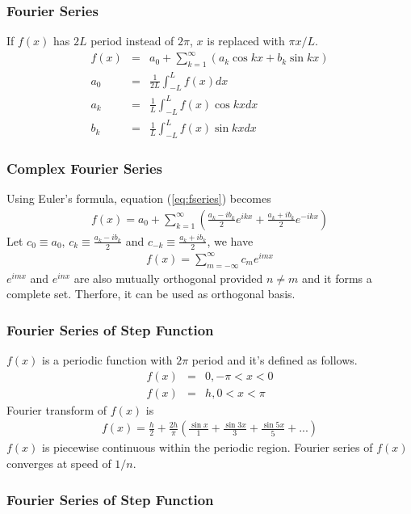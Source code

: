 \documentclass{beamer}
\begin{document}
\begin{frame}
\frametitle{Fourier Series}
If $f(x)$ has $2L$ period instead of $2\pi$, $x$ is replaced with $\pi x /L$.
\begin{eqnarray}
f(x)&=&a_0 + \sum_{k=1}^{\infty} \left(a_k\cos kx + b_k \sin kx\right) \nonumber \\
a_0&=&\frac{1}{2L}\int_{-L}^{L}f(x) dx \nonumber \\
a_k&=&\frac{1}{L}\int_{-L}^{L}f(x) \cos kx dx \nonumber \\
b_k&=&\frac{1}{L}\int_{-L}^{L}f(x) \sin kx dx
\label{eq:fseries_pL}
\end{eqnarray}
\end{frame}
\begin{frame}
\frametitle{Complex Fourier Series}
Using Euler's formula, equation (\ref{eq:fseries}) becomes 
\begin{eqnarray}
f(x)=a_0 + \sum_{k=1}^{\infty} \left(\frac{a_k - ib_k}{2} e^{ikx} + \frac{a_k + ib_k}{2}e^{-ikx}\right) \nonumber
\end{eqnarray}
Let $c_0 \equiv a_0$, $c_k \equiv \frac{a_k - ib_k}{2}$ and $c_{-k} \equiv \frac{a_k + ib_k}{2}$, we have
\begin{eqnarray}
f(x)=\sum_{m=-\infty}^{\infty} c_m e^{imx}
\label{eq:cfseries}
\end{eqnarray}
$e^{imx}$ and $e^{inx}$ are also mutually orthogonal provided $n \neq m$ and it forms a complete set. Therfore, it can be used as orthogonal basis.
\end{frame}
\begin{frame}
\frametitle{Fourier Series of Step Function}
$f(x)$ is a periodic function with $2\pi$ period and it's defined as follows.
\begin{eqnarray}
f(x)&=& 0, -\pi < x < 0 \nonumber \\
f(x)&=& h, 0 < x < \pi
\label{eq:stepfunc}
\end{eqnarray}
Fourier transform of $f(x)$ is
\begin{eqnarray}
f(x)= \frac{h}{2} + \frac{2h}{\pi} \left( \frac{\sin x}{1} + \frac{\sin 3x}{3} + \frac{\sin 5x}{5} + ...\right)
\label{eq:stepfunc_ft}
\end{eqnarray}
$f(x)$ is piecewise continuous within the periodic region. Fourier series of $f(x)$ converges at speed of $1/n$.
\end{frame}
\begin{frame}
\frametitle{Fourier Series of Step Function}
\end{frame}
\end{document}
